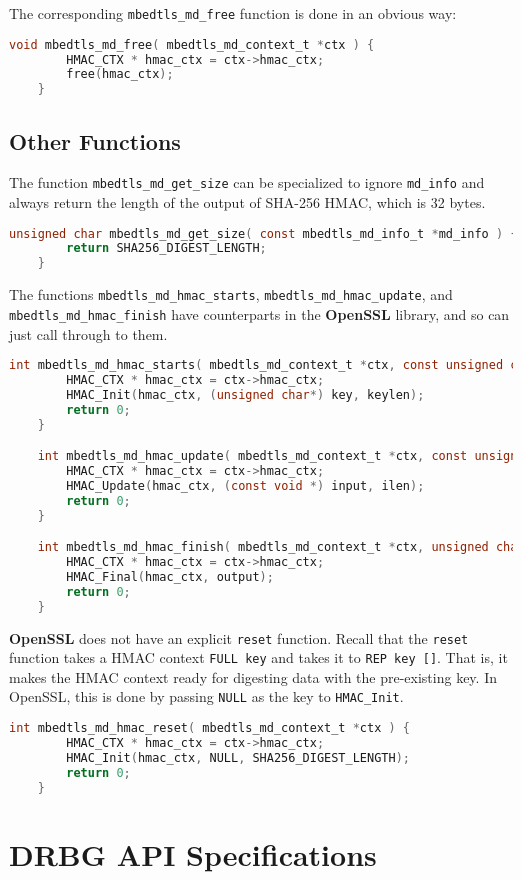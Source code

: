 \documentclass[pageno]{jpaper}
\newcommand{\stdtitle}[1]{\textbf{#1}}
\begin{document}
The corresponding \lstinline{mbedtls_md_free} function is done in an obvious way:

\begin{lstlisting}[language=C]
    void mbedtls_md_free( mbedtls_md_context_t *ctx ) {
        HMAC_CTX * hmac_ctx = ctx->hmac_ctx;
        free(hmac_ctx);
    }
\end{lstlisting}


\subsection{Other Functions}

The function \lstinline{mbedtls_md_get_size} can be specialized to ignore \lstinline{md_info} and always return the length of the output of SHA-256 HMAC, which is 32 bytes.

\begin{lstlisting}[language=C]
    unsigned char mbedtls_md_get_size( const mbedtls_md_info_t *md_info ) {
        return SHA256_DIGEST_LENGTH;
    }
\end{lstlisting}

The functions \lstinline{mbedtls_md_hmac_starts}, \lstinline{mbedtls_md_hmac_update}, and \lstinline{mbedtls_md_hmac_finish} have counterparts in the \stdtitle{OpenSSL} library, and so can just call through to them.

\begin{lstlisting}[language=C]
    int mbedtls_md_hmac_starts( mbedtls_md_context_t *ctx, const unsigned char *key, size_t keylen ) {
        HMAC_CTX * hmac_ctx = ctx->hmac_ctx;
        HMAC_Init(hmac_ctx, (unsigned char*) key, keylen);
        return 0;
    }

    int mbedtls_md_hmac_update( mbedtls_md_context_t *ctx, const unsigned char *input, size_t ilen ) {
        HMAC_CTX * hmac_ctx = ctx->hmac_ctx;
        HMAC_Update(hmac_ctx, (const void *) input, ilen);
        return 0;
    }

    int mbedtls_md_hmac_finish( mbedtls_md_context_t *ctx, unsigned char *output) {
        HMAC_CTX * hmac_ctx = ctx->hmac_ctx;
        HMAC_Final(hmac_ctx, output);
        return 0;
    }
\end{lstlisting}

\stdtitle{OpenSSL} does not have an explicit \lstinline{reset} function. Recall that the \lstinline{reset} function takes a HMAC context \lstinline{FULL key} and takes it to \lstinline{REP key []}. That is, it makes the HMAC context ready for digesting data with the pre-existing key. In OpenSSL, this is done by passing \lstinline{NULL} as the key to \lstinline{HMAC_Init}.

\begin{lstlisting}[language=C]
    int mbedtls_md_hmac_reset( mbedtls_md_context_t *ctx ) {
        HMAC_CTX * hmac_ctx = ctx->hmac_ctx;
        HMAC_Init(hmac_ctx, NULL, SHA256_DIGEST_LENGTH);
        return 0;
    }
\end{lstlisting}
\section{DRBG API Specifications} \label{appendix_api}
\end{document}
